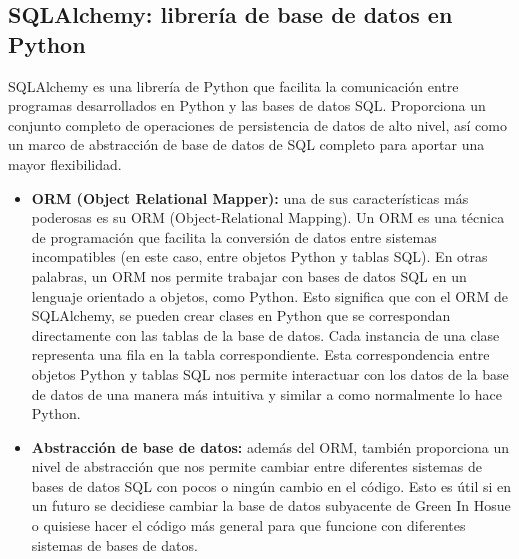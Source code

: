     \subsection{SQLAlchemy: librería de base de datos en Python}
    SQLAlchemy \cite{wiki:sqlalchemy} es una librería de Python que facilita la comunicación entre programas desarrollados en Python y las bases de datos SQL. Proporciona un conjunto completo de operaciones de persistencia de datos de alto nivel, así como un marco de abstracción de base de datos de SQL completo para aportar una mayor flexibilidad. 
    \begin{itemize}
        \item \textbf{ORM (Object Relational Mapper):} una de sus características más poderosas es su ORM (Object-Relational Mapping). Un ORM es una técnica de programación que facilita la conversión de datos entre sistemas incompatibles (en este caso, entre objetos Python y tablas SQL). En otras palabras, un ORM nos permite trabajar con bases de datos SQL en un lenguaje orientado a objetos, como Python. Esto significa que con el ORM de SQLAlchemy, se pueden crear clases en Python que se correspondan directamente con las tablas de la base de datos. Cada instancia de una clase representa una fila en la tabla correspondiente. Esta correspondencia entre objetos Python y tablas SQL nos permite interactuar con los datos de la base de datos de una manera más intuitiva y similar a como normalmente lo hace Python.
        \item \textbf{Abstracción de base de datos:} además del ORM, también proporciona un nivel de abstracción que nos permite cambiar entre diferentes sistemas de bases de datos SQL con pocos o ningún cambio en el código. Esto es útil si en un futuro se decidiese cambiar la base de datos subyacente de Green In Hosue o quisiese hacer el código más general para que funcione con diferentes sistemas de bases de datos.
    \end{itemize}

